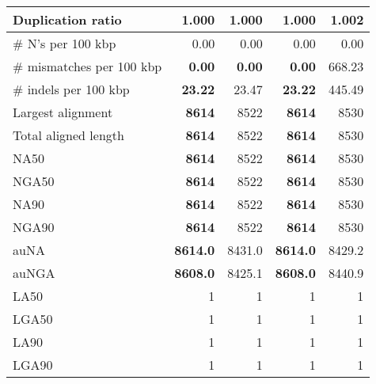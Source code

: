 \documentclass[12pt,a4paper]{article}
\begin{document}
\begin{table}[ht]
\begin{center}
\begin{tabular}{|l*{4}{|r}|}
Duplication ratio & {\bf 1.000} & {\bf 1.000} & {\bf 1.000} & 1.002 \\ \hline
\# N's per 100 kbp & 0.00 & 0.00 & 0.00 & 0.00 \\ \hline
\# mismatches per 100 kbp & {\bf 0.00} & {\bf 0.00} & {\bf 0.00} & 668.23 \\ \hline
\# indels per 100 kbp & {\bf 23.22} & 23.47 & {\bf 23.22} & 445.49 \\ \hline
Largest alignment & {\bf 8614} & 8522 & {\bf 8614} & 8530 \\ \hline
Total aligned length & {\bf 8614} & 8522 & {\bf 8614} & 8530 \\ \hline
NA50 & {\bf 8614} & 8522 & {\bf 8614} & 8530 \\ \hline
NGA50 & {\bf 8614} & 8522 & {\bf 8614} & 8530 \\ \hline
NA90 & {\bf 8614} & 8522 & {\bf 8614} & 8530 \\ \hline
NGA90 & {\bf 8614} & 8522 & {\bf 8614} & 8530 \\ \hline
auNA & {\bf 8614.0} & 8431.0 & {\bf 8614.0} & 8429.2 \\ \hline
auNGA & {\bf 8608.0} & 8425.1 & {\bf 8608.0} & 8440.9 \\ \hline
LA50 & 1 & 1 & 1 & 1 \\ \hline
LGA50 & 1 & 1 & 1 & 1 \\ \hline
LA90 & 1 & 1 & 1 & 1 \\ \hline
LGA90 & 1 & 1 & 1 & 1 \\ \hline
\end{tabular}
\end{center}
\end{table}
\end{document}
